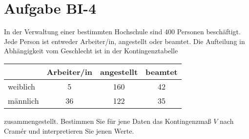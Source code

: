 
\section{Aufgabe BI-4}

\begin{task}
    In der Verwaltung einer bestimmten Hochschule sind 400 Personen beschäftigt. Jede Person ist entweder Arbeiter/in, angestellt oder beamtet. Die Aufteilung in Abhängigkeit vom Geschlecht ist in der Kontingenztabelle

    \begin{table}[H]
    \centering
    \begin{tabular}{l|c|c|c}
                 & Arbeiter/in & angestellt & beamtet \\ \hline
        weiblich & 5           & 160        & 42      \\
        männlich & 36          & 122        & 35     
    \end{tabular}
    \end{table}

    zusammengestellt. Bestimmen Sie für jene Daten das Kontingenzmaß $V$ nach Cramér und interpretieren Sie jenen Werte.
\end{task}
